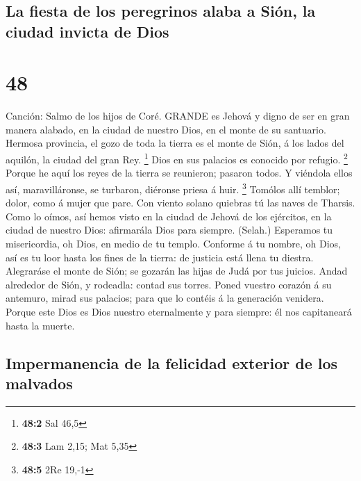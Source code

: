 \hypertarget{la-fiesta-de-los-peregrinos-alaba-a-siuxf3n-la-ciudad-invicta-de-dios}{%
\subsection{La fiesta de los peregrinos alaba a Sión, la ciudad invicta
de
Dios}\label{la-fiesta-de-los-peregrinos-alaba-a-siuxf3n-la-ciudad-invicta-de-dios}}

\hypertarget{section-47}{%
\section{48}\label{section-47}}

 Canción: Salmo de los hijos de Coré. GRANDE es Jehová y
digno de ser en gran manera alabado, en la ciudad de nuestro Dios, en el
monte de su santuario.  Hermosa provincia, el gozo de toda
la tierra es el monte de Sión, á los lados del aquilón, la ciudad del
gran Rey. \footnote{\textbf{48:2} Sal 46,5}  Dios en sus
palacios es conocido por refugio. \footnote{\textbf{48:3} Lam 2,15; Mat
  5,35}  Porque he aquí los reyes de la tierra se reunieron;
pasaron todos.  Y viéndola ellos así, maravilláronse, se
turbaron, diéronse priesa á huir. \footnote{\textbf{48:5} 2Re 19,-1}
 Tomólos allí temblor; dolor, como á mujer que pare.
 Con viento solano quiebras tú las naves de Tharsis.
 Como lo oímos, así hemos visto en la ciudad de Jehová de
los ejércitos, en la ciudad de nuestro Dios: afirmarála Dios para
siempre. (Selah.)  Esperamos tu misericordia, oh Dios, en
medio de tu templo.  Conforme á tu nombre, oh Dios, así es
tu loor hasta los fines de la tierra: de justicia está llena tu diestra.
 Alegraráse el monte de Sión; se gozarán las hijas de Judá
por tus juicios.  Andad alrededor de Sión, y rodeadla:
contad sus torres.  Poned vuestro corazón á su antemuro,
mirad sus palacios; para que lo contéis á la generación venidera.
 Porque este Dios es Dios nuestro eternalmente y para
siempre: él nos capitaneará hasta la muerte.

\hypertarget{impermanencia-de-la-felicidad-exterior-de-los-malvados}{%
\subsection{Impermanencia de la felicidad exterior de los
malvados}\label{impermanencia-de-la-felicidad-exterior-de-los-malvados}}

